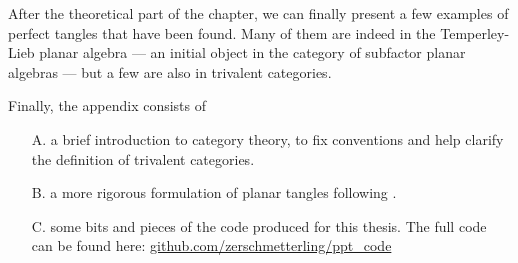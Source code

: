 After the theoretical part of the chapter, we can finally present a few examples of perfect tangles that have been found. Many of them are indeed in the Temperley-Lieb planar algebra --- an initial object in the category of subfactor planar algebras --- but a few are also in trivalent categories.

\bigskip
Finally, the appendix consists of 
\begin{itemize}
\item[\textsf{A.}] a brief introduction to category theory, to fix conventions and help clarify the definition of trivalent categories.
\item[\textsf{B.}] a more rigorous formulation of planar tangles following \cite{KODIYALAM:OnPlanarAlgebras}.
\item[\textsf{C.}] some bits and pieces of the code produced for this thesis. The full code can be found here: \url{github.com/zerschmetterling/ppt_code}
\end{itemize}
